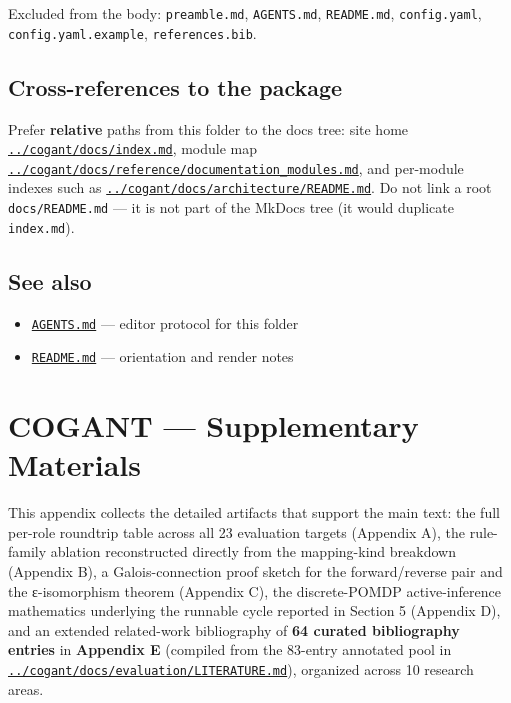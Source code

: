 \documentclass[
]{article}
\providecommand{\tightlist}{%
  \setlength{\itemsep}{0pt}\setlength{\parskip}{0pt}}
\begin{document}
Excluded from the body: \texttt{preamble.md}, \texttt{AGENTS.md},
\texttt{README.md}, \texttt{config.yaml}, \texttt{config.yaml.example},
\texttt{references.bib}.

\subsection{Cross-references to the
package}\label{cross-references-to-the-package}

Prefer \textbf{relative} paths from this folder to the docs tree: site
home \href{../cogant/docs/index.md}{\texttt{../cogant/docs/index.md}},
module map
\href{../cogant/docs/reference/documentation_modules.md}{\texttt{../cogant/docs/reference/documentation\_modules.md}},
and per-module indexes such as
\href{../cogant/docs/architecture/README.md}{\texttt{../cogant/docs/architecture/README.md}}.
Do not link a root \texttt{docs/README.md} --- it is not part of the
MkDocs tree (it would duplicate \texttt{index.md}).

\subsection{See also}\label{see-also}

\begin{itemize}
\tightlist
\item
  \href{AGENTS.md}{\texttt{AGENTS.md}} --- editor protocol for this
  folder
\item
  \href{README.md}{\texttt{README.md}} --- orientation and render notes
\end{itemize}

\newpage

\section{COGANT --- Supplementary
Materials}\label{cogant-supplementary-materials}

This appendix collects the detailed artifacts that support the main
text: the full per-role roundtrip table across all 23 evaluation targets
(Appendix A), the rule-family ablation reconstructed directly from the
mapping-kind breakdown (Appendix B), a Galois-connection proof sketch
for the forward/reverse pair and the ε-isomorphism theorem (Appendix C),
the discrete-POMDP active-inference mathematics underlying the runnable
cycle reported in Section 5 (Appendix D), and an extended related-work
bibliography of \textbf{64 curated bibliography entries} in
\textbf{Appendix E} (compiled from the 83-entry annotated pool in
\href{../cogant/docs/evaluation/LITERATURE.md}{\texttt{../cogant/docs/evaluation/LITERATURE.md}}),
organized across 10 research areas.
\end{document}
